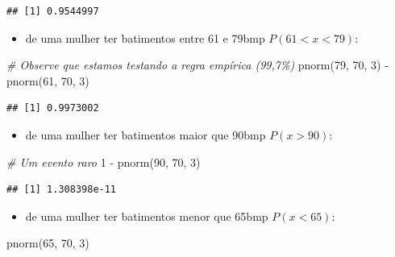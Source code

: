 \documentclass[
]{book}
\newenvironment{Shaded}{\begin{snugshade}}{\end{snugshade}}
\newcommand{\CommentTok}[1]{\textcolor[rgb]{0.56,0.35,0.01}{\textit{#1}}}
\newcommand{\DecValTok}[1]{\textcolor[rgb]{0.00,0.00,0.81}{#1}}
\newcommand{\FunctionTok}[1]{\textcolor[rgb]{0.00,0.00,0.00}{#1}}
\newcommand{\NormalTok}[1]{#1}
\newcommand{\SpecialCharTok}[1]{\textcolor[rgb]{0.00,0.00,0.00}{#1}}
\providecommand{\tightlist}{%
  \setlength{\itemsep}{0pt}\setlength{\parskip}{0pt}}
\begin{document}
\begin{verbatim}
## [1] 0.9544997
\end{verbatim}

\begin{itemize}
\tightlist
\item
  de uma mulher ter batimentos entre 61 e 79bmp \(P(61 < x < 79)\):
\end{itemize}

\begin{Shaded}
\begin{Highlighting}[]
\CommentTok{\# Observe que estamos testando a regra empírica (99,7\%)}
\FunctionTok{pnorm}\NormalTok{(}\DecValTok{79}\NormalTok{, }\DecValTok{70}\NormalTok{, }\DecValTok{3}\NormalTok{) }\SpecialCharTok{{-}} \FunctionTok{pnorm}\NormalTok{(}\DecValTok{61}\NormalTok{, }\DecValTok{70}\NormalTok{, }\DecValTok{3}\NormalTok{)}
\end{Highlighting}
\end{Shaded}

\begin{verbatim}
## [1] 0.9973002
\end{verbatim}

\begin{itemize}
\tightlist
\item
  de uma mulher ter batimentos maior que 90bmp \(P(x > 90)\):
\end{itemize}

\begin{Shaded}
\begin{Highlighting}[]
\CommentTok{\# Um evento raro}
\DecValTok{1} \SpecialCharTok{{-}} \FunctionTok{pnorm}\NormalTok{(}\DecValTok{90}\NormalTok{, }\DecValTok{70}\NormalTok{, }\DecValTok{3}\NormalTok{)}
\end{Highlighting}
\end{Shaded}

\begin{verbatim}
## [1] 1.308398e-11
\end{verbatim}

\begin{itemize}
\tightlist
\item
  de uma mulher ter batimentos menor que 65bmp \(P(x < 65)\):
\end{itemize}

\begin{Shaded}
\begin{Highlighting}[]
\FunctionTok{pnorm}\NormalTok{(}\DecValTok{65}\NormalTok{, }\DecValTok{70}\NormalTok{, }\DecValTok{3}\NormalTok{)}
\end{Highlighting}
\end{Shaded}
\end{document}
